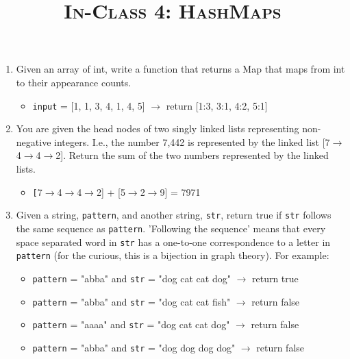 \documentclass{article}
\title{\large{\textsc{In-Class 4: HashMaps}}}
\date{}
\begin{document}
    \maketitle

    \subsection*{}



    \begin{enumerate}
        \item Given an array of int, write a function that returns a Map that maps from int to their appearance counts.
        \begin{itemize}
            \item \texttt{input} = [1, 1, 3, 4, 1, 4, 5] $\rightarrow$ return [1:3, 3:1, 4:2, 5:1]
        \end{itemize}


        \item You are given the head nodes of two singly linked lists representing non-negative integers. I.e., the number 7,442 is represented by the linked list [7$\rightarrow$4$\rightarrow$4$\rightarrow$2]. Return the sum of the two numbers represented by the linked lists.
        \begin{itemize}
            \item \texttt[7$\rightarrow$4$\rightarrow$4$\rightarrow$2] + [5$\rightarrow$2$\rightarrow$9] = 7971

        \end{itemize}

        \item Given a string, \texttt{pattern}, and another string, \texttt{str}, return true if \texttt{str} follows the same sequence as \texttt{pattern}.  'Following the sequence' means that every space separated word in \texttt{str} has a one-to-one correspondence to a letter in \texttt{pattern} (for the curious, this is a bijection in graph theory).  For example:

        \begin{itemize}
            \item \texttt{pattern} = "abba" and \texttt{str} = "dog cat cat dog" $\rightarrow$ return true
            \item \texttt{pattern} = "abba" and \texttt{str} = "dog cat cat fish" $\rightarrow$ return false
            \item \texttt{pattern} = "aaaa" and \texttt{str} = "dog cat cat dog" $\rightarrow$ return false
            \item \texttt{pattern} = "abba" and \texttt{str} = "dog dog dog dog" $\rightarrow$ return false
        \end{itemize}


\end{enumerate}
\end{document}
